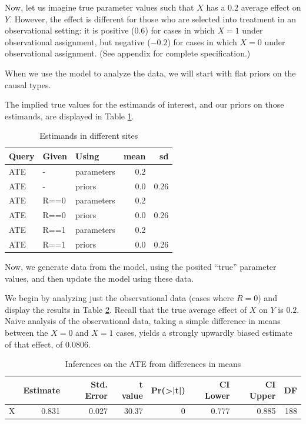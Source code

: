 \documentclass[
  12pt,
]{book}
\begin{document}
Now, let us imagine true parameter values such that \(X\) has a \(0.2\) average effect on \(Y\). However, the effect is different for those who are selected into treatment in an observational setting: it is positive (\(0.6\)) for cases in which \(X=1\) under observational assignment, but negative (\(-0.2\)) for cases in which \(X=0\) under observational assignment. (See appendix for complete specification.)

When we use the model to analyze the data, we will start with flat priors on the causal types.

The implied true values for the estimands of interest, and our priors on those estimands, are displayed in Table \ref{tab:fusionestimands}.

\begin{table}

\caption{\label{tab:fusionestimands}Estimands in different sites}
\centering
\begin{tabular}[t]{l|l|l|r|r}
\hline
Query & Given & Using & mean & sd\\
\hline
ATE & - & parameters & 0.2 & \\
\hline
ATE & - & priors & 0.0 & 0.26\\
\hline
ATE & R==0 & parameters & 0.2 & \\
\hline
ATE & R==0 & priors & 0.0 & 0.26\\
\hline
ATE & R==1 & parameters & 0.2 & \\
\hline
ATE & R==1 & priors & 0.0 & 0.26\\
\hline
\end{tabular}
\end{table}

Now, we generate data from the model, using the posited ``true'' parameter values, and then update the model using these data.

We begin by analyzing just the observational data (cases where \(R=0\)) and display the results in Table \ref{tab:fusiondim}. Recall that the true average effect of \(X\) on \(Y\) is \(0.2\). Naive analysis of the observational data, taking a simple difference in means between the \(X=0\) and \(X=1\) cases, yields a strongly upwardly biased estimate of that effect, of 0.0806.

\begin{table}

\caption{\label{tab:fusiondim}Inferences on the ATE from differences in means}
\centering
\begin{tabular}[t]{l|r|r|r|r|r|r|r}
\hline
  & Estimate & Std. Error & t value & Pr(>|t|) & CI Lower & CI Upper & DF\\
\hline
X & 0.831 & 0.027 & 30.37 & 0 & 0.777 & 0.885 & 188\\
\hline
\end{tabular}
\end{table}
\end{document}
